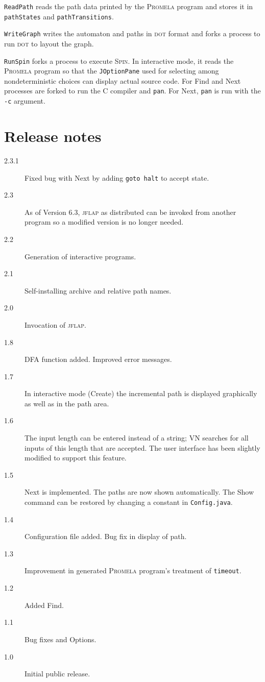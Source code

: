 \documentclass[11pt]{article}
\newcommand{\vn}{\textsc{VN}}
\newcommand{\jf}{\textsc{jflap}}
\newcommand{\dt}{\textsc{dot}}
\newcommand{\spn}{\textsc{Spin}}
\newcommand{\prm}{\textsc{Promela}}
\newcommand{\p}[1]{\texttt{#1}}
\newcommand{\bu}[1]{\textsf{#1}}
\begin{document}
\p{ReadPath} reads the path data printed by the \prm{} program and stores it in
\p{pathStates} and \p{pathTransitions}.

\p{WriteGraph} writes the automaton and paths in \dt{} format and forks a process to
run \dt{} to layout the graph.

\p{RunSpin} forks a process to execute \spn{}. In interactive mode, it reads the
\prm{} program so that the \p{JOptionPane} used for selecting among
nondeterministic choices can display actual source code. For \bu{Find} and
\bu{Next} processes are forked to run the C compiler and \p{pan}. 
For \bu{Next}, \p{pan} is run with the \p{-c} argument.


\appendix

\section{Release notes}

\begin{description}
\item[2.3.1] Fixed bug with \bu{Next} by adding \p{goto halt} to accept
state.
\item[2.3] As of Version 6.3, \jf{} as distributed can be invoked from another
program so a modified version is no longer needed.
\item[2.2] Generation of interactive programs.
\item[2.1] Self-installing archive and relative path names.
\item[2.0] Invocation of \jf{}.
\item[1.8] \bu{DFA} function added. Improved error messages.
\item[1.7] In interactive mode (\bu{Create}) the incremental path is displayed
graphically as well as in the path area.
\item[1.6] The input length can be entered instead of a string;
\vn{} searches for all inputs of this length that are accepted.
The user interface has been slightly modified to support this feature.
\item[1.5] \bu{Next} is implemented. The paths are now shown automatically.
The \bu{Show} command can be restored by changing a constant
in \p{Config.java}.
\item[1.4] Configuration file added. Bug fix in display of path.
\item[1.3] Improvement in generated \prm{} program's treatment of \p{timeout}.
\item[1.2] Added \bu{Find}.
\item[1.1] Bug fixes and \bu{Options}.
\item[1.0] Initial public release.
\end{description}
\end{document}
